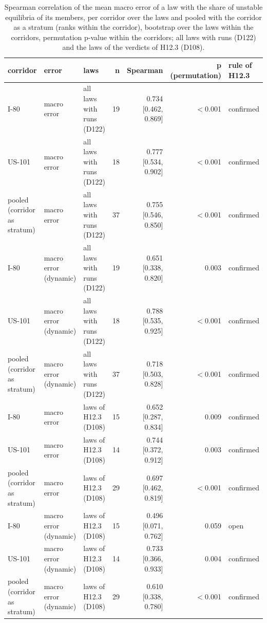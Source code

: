 \begin{table}[htbp]
\centering
\caption{Spearman correlation of the mean macro error of a law with the share of unstable equilibria of its members, per corridor over the laws and pooled with the corridor as a stratum (ranks within the corridor), bootstrap over the laws within the corridors, permutation p-value within the corridors; all laws with runs (D122) and the laws of the verdicts of H12.3 (D108).}
\label{tab:correlation-pooled}
\small
\begin{tabular}{lllrrrl}
\toprule
corridor & error & laws & n & Spearman & p (permutation) & rule of H12.3 \\
\midrule
I-80 & macro error & all laws with runs (D122) & 19 & 0.734 [0.462, 0.869] & $<$0.001 & confirmed \\
US-101 & macro error & all laws with runs (D122) & 18 & 0.777 [0.534, 0.902] & $<$0.001 & confirmed \\
pooled (corridor as stratum) & macro error & all laws with runs (D122) & 37 & 0.755 [0.546, 0.850] & $<$0.001 & confirmed \\
I-80 & macro error (dynamic) & all laws with runs (D122) & 19 & 0.651 [0.338, 0.820] & 0.003 & confirmed \\
US-101 & macro error (dynamic) & all laws with runs (D122) & 18 & 0.788 [0.535, 0.925] & $<$0.001 & confirmed \\
pooled (corridor as stratum) & macro error (dynamic) & all laws with runs (D122) & 37 & 0.718 [0.503, 0.828] & $<$0.001 & confirmed \\
I-80 & macro error & laws of H12.3 (D108) & 15 & 0.652 [0.287, 0.834] & 0.009 & confirmed \\
US-101 & macro error & laws of H12.3 (D108) & 14 & 0.744 [0.372, 0.912] & 0.003 & confirmed \\
pooled (corridor as stratum) & macro error & laws of H12.3 (D108) & 29 & 0.697 [0.462, 0.819] & $<$0.001 & confirmed \\
I-80 & macro error (dynamic) & laws of H12.3 (D108) & 15 & 0.496 [0.071, 0.762] & 0.059 & open \\
US-101 & macro error (dynamic) & laws of H12.3 (D108) & 14 & 0.733 [0.366, 0.933] & 0.004 & confirmed \\
pooled (corridor as stratum) & macro error (dynamic) & laws of H12.3 (D108) & 29 & 0.610 [0.338, 0.780] & $<$0.001 & confirmed \\
\bottomrule
\end{tabular}
\end{table}
